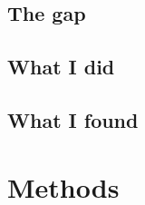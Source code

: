 \subsection{The gap}




\subsection{What I did}




\subsection{What I found}





\section{Methods}


























































